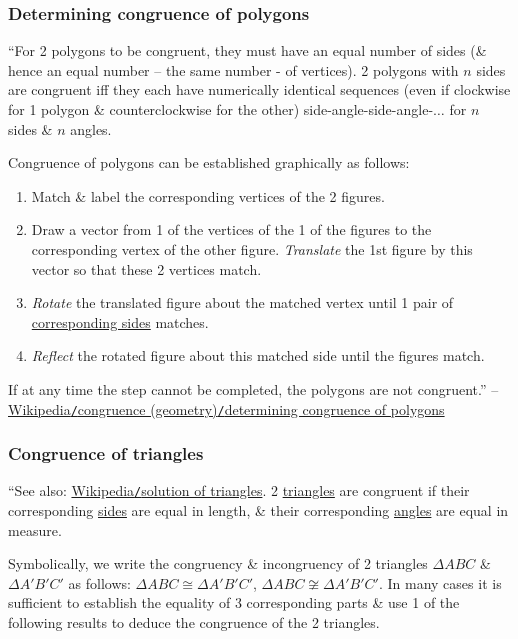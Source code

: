 \documentclass{article}
\begin{document}

\subsubsection{Determining congruence of polygons}
``For 2 polygons to be congruent, they must have an equal number of sides (\& hence an equal number -- the same number - of vertices). 2 polygons with $n$ sides are congruent iff they each have numerically identical sequences (even if clockwise for 1 polygon \& counterclockwise for the other) side-angle-side-angle-$\ldots$ for $n$ sides \& $n$ angles.

Congruence of polygons can be established graphically as follows:
\begin{enumerate}
	\item Match \& label the corresponding vertices of the 2 figures.
	\item Draw a vector from 1 of the vertices of the 1 of the figures to the corresponding vertex of the other figure. \textit{Translate} the 1st figure by this vector so that these 2 vertices match.
	\item \textit{Rotate} the translated figure about the matched vertex until 1 pair of \href{https://en.wikipedia.org/wiki/Corresponding_sides}{corresponding sides} matches.
	\item \textit{Reflect} the rotated figure about this matched side until the figures match.
\end{enumerate}
If at any time the step cannot be completed, the polygons are not congruent.'' -- \href{https://en.wikipedia.org/wiki/Congruence_(geometry)#Determining_congruence_of_polygons}{Wikipedia\texttt{/}congruence (geometry)\texttt{/}determining congruence of polygons}

\subsubsection{Congruence of triangles}
``See also: \href{https://en.wikipedia.org/wiki/Solution_of_triangles}{Wikipedia\texttt{/}solution of triangles}. 2 \href{https://en.wikipedia.org/wiki/Triangle}{triangles} are congruent if their corresponding \href{https://en.wikipedia.org/wiki/Edge_(geometry)}{sides} are equal in length, \& their corresponding \href{https://en.wikipedia.org/wiki/Angle}{angles} are equal in measure.

Symbolically, we write the congruency \& incongruency of 2 triangles $\Delta ABC$ \& $\Delta A'B'C'$ as follows: $\Delta ABC\cong\Delta A'B'C'$, $\Delta ABC\not\cong\Delta A'B'C'$. In many cases it is sufficient to establish the equality of 3 corresponding parts \& use 1 of the following results to deduce the congruence of the 2 triangles.
\end{document}
